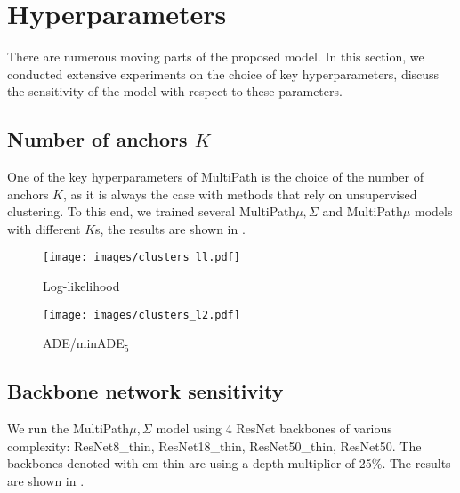 \documentclass{article}
\newcommand{\multiflow}{MultiPath\xspace}
\begin{document}
\section{Hyperparameters}
\label{sec:hyperparameters}

There are numerous moving parts of the proposed model. In this section, we conducted extensive experiments on the choice of key hyperparameters, discuss the sensitivity of the model with respect to these parameters.


\subsection{Number of anchors $K$}
\label{sec:anchors}

One of the key hyperparameters of \multiflow is the choice of the number of anchors $K$, as it is always the case with methods that rely on unsupervised clustering. To this end, we trained several \multiflow $\mu,\Sigma$ and \multiflow $\mu$ models with different $K$s, the results are shown in .

\begin{figure*}[!htbp]
\centering
  \begin{subfigure}[b]{0.35\textwidth}
    \texttt{[image: images/clusters\_ll.pdf]}
    \caption{Log-likelihood}
    \label{fig:clusters_ll}
  \end{subfigure}
  \begin{subfigure}[b]{0.35\textwidth}
    \texttt{[image: images/clusters\_l2.pdf]}
    \caption{ADE/minADE$_5$}
    \label{fig:clusters_l2}
  \end{subfigure}
\caption{Results as function of the number of clusters $K$. (a): \multiflow $\mu,\Sigma$ on the log-likelihood metric with $K$ ranging from 1 to 64. (b): \multiflow $\mu$ on the ADE and minADE$_5$ metrics, with $K$ ranging from 1 to 128.
}
\label{fig:clusters}
\end{figure*}


\subsection{Backbone network sensitivity}
\label{sec:backbone}

We run the \multiflow $\mu, \Sigma$ model using 4 ResNet \cite{He16} backbones of various complexity: ResNet8\_thin, ResNet18\_thin, ResNet50\_thin, ResNet50. The backbones denoted with {em thin} are using a depth multiplier of 25\%. The results are shown in .
\end{document}
